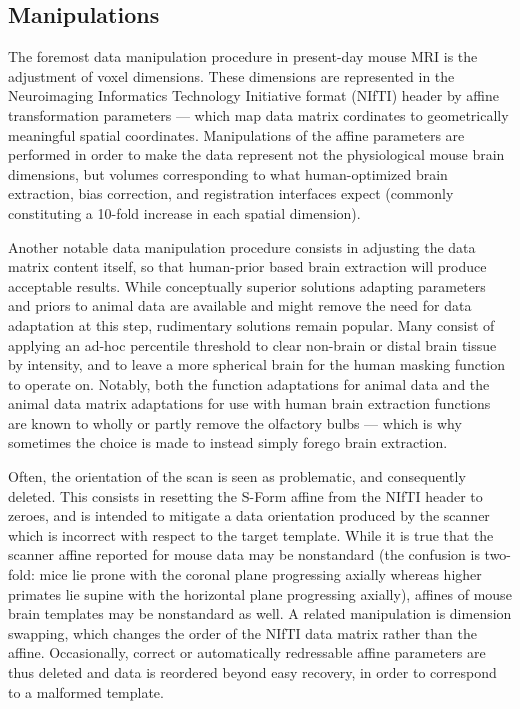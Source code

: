 \subsection{Manipulations}
The foremost data manipulation procedure in present-day mouse MRI is the adjustment of voxel dimensions.
These dimensions are represented in the Neuroimaging Informatics Technology Initiative format (NIfTI) header \cite{nifti} by affine transformation parameters --- which map data matrix cordinates to geometrically meaningful spatial coordinates.
Manipulations of the affine parameters are performed in order to make the data represent not the physiological mouse brain dimensions, but volumes corresponding to what human-optimized brain extraction, bias correction, and registration interfaces expect (commonly constituting a 10-fold increase in each spatial dimension).

Another notable data manipulation procedure consists in adjusting the data matrix content itself, so that human-prior based brain extraction will produce acceptable results.
While conceptually superior solutions adapting parameters and priors to animal data are available \cite{rbet,Oguz2014} and might remove the need for data adaptation at this step, rudimentary solutions remain popular.
Many consist of applying an ad-hoc percentile threshold to clear non-brain or distal brain tissue by intensity, and to leave a more spherical brain for the human masking function to operate on.
Notably, both the function adaptations for animal data and the animal data matrix adaptations for use with human brain extraction functions are known to wholly or partly remove the olfactory bulbs --- which is why sometimes the choice is made to instead simply forego brain extraction.

Often, the orientation of the scan is seen as problematic, and consequently deleted.
This consists in resetting the S-Form affine from the NIfTI header to zeroes, and is intended to mitigate a data orientation produced by the scanner which is incorrect with respect to the target template.
While it is true that the scanner affine reported for mouse data may be nonstandard (the confusion is two-fold: mice lie prone with the coronal plane progressing axially whereas higher primates lie supine with the horizontal plane progressing axially), affines of mouse brain templates may be nonstandard as well.
A related manipulation is dimension swapping, which changes the order of the NIfTI data matrix rather than the affine.
Occasionally, correct or automatically redressable affine parameters are thus deleted and data is reordered beyond easy recovery, in order to correspond to a malformed template.

